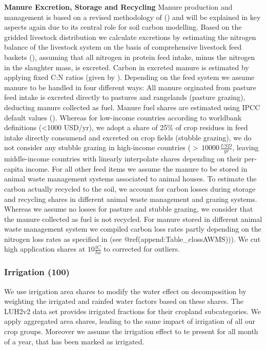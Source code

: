 \documentclass[gc, manuscript]{copernicus}
\begin{document}
\textbf{Manure Excretion, Storage and Recycling}
Manure production and management is based on a revised methodology of (\citep{bodirsky2012}) and will be explained in key aspects again due to its central role for soil carbon modelling. Based on the gridded livestock distribution we calculate excretions by estimating the nitrogen balance of the livestock system on the basis of comprehensive livestock feed baskets (\citep{weindl}), assuming that all nitrogen in protein feed intake, minus the nitrogen in the slaughter mass, is excreted. Carbon in excreted manure is estimated by applying fixed C:N ratios (given by \citep[(][]{ipcc_2019_2019}).
Depending on the feed system we assume manure to be handled in four different ways:
All manure orginated from pasture feed intake is excreted directly to pastures and rangelands (pasture grazing), deducting manure collected as fuel. Manure fuel shares are estimated using IPCC default values (\citet{ippc_2006_2006}).
Whereas for low-income countries according to worldbank definitions (\textless1000 USD/yr), we adopt a share of 25\% of crop residues in feed intake directly consumend and excreted on crop fields (stubble grazing), we do not consider any stubble grazing in high-income countries (\(>\,10000\,\tfrac{USD}{yr}\), leaving middle-income countries with linearly interpolate shares depending on their per-capita income.
For all other feed items we assume the manure to be stored in animal waste management systems associated to animal houses.
To estimate the carbon actually recycled to the soil, we account for carbon losses during storage and recycling shares in different animal waste management and grazing systems. Whereas we assume no losses for pasture and stubble grazing, we consider that the manure collected as fuel is not recycled. For manure stored in different animal waste management system we compiled carbon loss rates partly depending on the nitrogen loss rates as specified in \citep{bodirsky2012} (see @ref(append:Table\_clossAWMS))). We cut high application shares at \(10\tfrac{\unit{tC}}{\unit{ha}}\) to corrected for outliers.

\hypertarget{irrigation-100}{%
\subsubsection{Irrigation (100)}\label{irrigation-100}}

We use irrigation area shares to modify the water effect on decomposition by weighting the irrigated and rainfed water factors based on these shares. The LUH2v2 data set provides irrigated fractions for their cropland subcategories. We apply aggregated area shares, leading to the same impact of irrigation of all our crop groups. Moreover we assume the irrigation effect to te present for all month of a year, that has been marked as irrigated.
\end{document}
